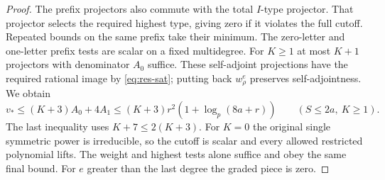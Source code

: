 \begin{proof}
The prefix projectors also commute with the total \(I\)-type projector. That projector selects the required
highest type, giving zero if it violates the full cutoff.
Repeated bounds on the same prefix take their minimum. The
zero-letter and one-letter prefix tests are scalar on a fixed
multidegree. For \(K\ge1\) at most \(K+1\) projectors with
denominator \(A_0\) suffice. These self-adjoint projections have
the required rational image by \eqref{eq:res-sat}; putting back
\(w_\rho^e\) preserves self-adjointness. We obtain
\[
             v_*\le (K+3)A_0+4A_1
             \le (K+3)r^2(1+\log_p(8a+r))
                        \qquad(S\le2a,\ K\ge1).
\]
The last inequality uses \(K+7\le2(K+3)\). For \(K=0\) the
original single symmetric power is irreducible, so the cutoff
is scalar and every allowed restricted polynomial lifts.
The weight and highest tests alone suffice and obey the same
final bound. For \(e\) greater than the last degree the graded
piece is zero.
\end{proof}
